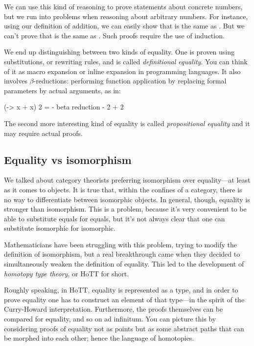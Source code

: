 \documentclass[DaoFP]{subfiles}
\begin{document}
We can use this kind of reasoning to prove statements about concrete numbers, but we run into problems when reasoning about arbitrary numbers. For instance, using our definition of addition, we can easily show that  is the same as . But we can't prove that  is the same as . Such proofs require the use of induction. 

We end up distinguishing between two kinds of equality. One is proven using substitutions, or rewriting rules, and is called \emph{definitional equality}. You can think of it as macro expansion or inline expansion in programming languages. It also involves $\beta$-reductions: performing function application by replacing formal parameters by actual arguments, as in:
\begin{haskell}
(\x -> x + x) 2 =
{- beta reduction -}
2 + 2
\end{haskell}

The second more interesting kind of equality is called \emph{propositional equality} and it may require actual proofs. 

\subsection{Equality vs isomorphism}

We talked about category theorists preferring isomorphism over equality---at least as it comes to objects. It is true that, within the confines of a category, there is no way to differentiate between isomorphic objects. In general, though, equality is stronger than isomorphism. This is a problem, because it's very convenient to be able to substitute equals for equals, but it's not always clear that one can substitute isomorphic for isomorphic. 

Mathematicians have been struggling with this problem, trying to modify the definition of isomorphism, but a real breakthrough came when they decided to simultaneously weaken the definition of equality. This led to the development of \emph{homotopy type theory}, or HoTT for short. 

Roughly speaking, in HoTT, equality is represented as a type, and in order to prove equality one has to construct an element of that type---in the spirit of the Curry-Howard interpretation. Furthermore, the proofs themselves can be compared for equality, and so on ad infinitum. You can picture this by considering proofs of equality not as points but as some abstract paths that can be morphed into each other; hence the language of homotopies.
\end{document}
